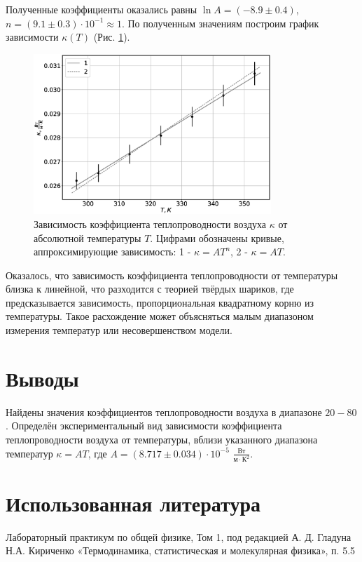\documentclass[12pt]{article}
\begin{document}
Полученные коэффициенты оказались равны \(\ln A = (-8.9 \pm 0.4)\), \(n = (9.1 \pm 0.3) \cdot 10 ^ {-1} \approx 1\). По полученным значениям 
построим график зависимости \(\kappa (T)\) (Рис. \ref{fig:kT}).  
\begin{figure}[H]
    \centering
    \includegraphics[width=0.8\textwidth]{kT.eps}
    \caption{Зависимость коэффициента теплопроводности воздуха \(\kappa \) от абсолютной температуры \(T\). Цифрами обозначены кривые, аппроксимирующие
        зависимость: 1 - \(\kappa = A T^n\), 2 - \(\kappa = A T\).}
    \label{fig:kT}
\end{figure}

Оказалось, что зависимость коэффициента теплопроводности от температуры близка к линейной, что разходится с теорией
твёрдых шариков, где предсказывается зависимость, пропорциональная квадратному корню из температуры. 
Такое расхождение может объясняться малым диапазоном измерения температур или несовершенством модели.

\section{Выводы}
Найдены значения коэффициентов теплопроводности воздуха в диапазоне \(20 - 80\) \textcelsius. Определён 
экспериментальный вид зависимости коэффициента теплопроводности воздуха от температуры, вблизи указанного 
диапазона температур \(\kappa = A T\), где \(A = (8.717 \pm 0.034) \cdot 10 ^ {-5}\) \(\frac{\textrm{Вт}}{\textrm{м} \cdot \textrm{К}^2}\).

\section{Использованная литература}
\begin{thebibliography}{9}
    Лабораторный практикум по общей физике, Том 1, под редакцией А. Д. Гладуна
    Н.А. Кириченко «Термодинамика, статистическая и молекулярная физика», п. 5.5
\end{thebibliography}
\end{document}
